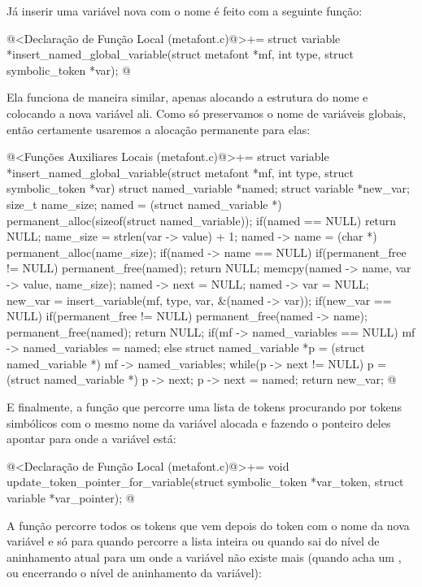 Já inserir uma variável nova com o nome é feito com a seguinte função:

\iniciocodigo
@<Declaração de Função Local (metafont.c)@>+=
struct variable *insert_named_global_variable(struct metafont *mf,
                                             int type,
                                             struct symbolic_token *var);
@
\fimcodigo

Ela funciona de maneira similar, apenas alocando a estrutura do nome e
colocando a nova variável ali. Como só preservamos o nome de variáveis
globais, então certamente usaremos a alocação permanente para elas:

\iniciocodigo
@<Funções Auxiliares Locais (metafont.c)@>+=
struct variable *insert_named_global_variable(struct metafont *mf,
                                             int type,
                                             struct symbolic_token *var){
  struct named_variable *named;
  struct variable *new_var;
  size_t name_size;
  named = (struct named_variable *)
              permanent_alloc(sizeof(struct named_variable));
  if(named == NULL)
    return NULL;
  name_size = strlen(var -> value) + 1;
  named -> name = (char *) permanent_alloc(name_size);
  if(named -> name == NULL){
    if(permanent_free != NULL)
      permanent_free(named);
    return NULL;
  }
  memcpy(named -> name, var -> value, name_size);
  named -> next = NULL;
  named -> var = NULL;
  new_var = insert_variable(mf, type, var, &(named -> var));
  if(new_var == NULL){
    if(permanent_free != NULL){
      permanent_free(named -> name);
      permanent_free(named);
      return NULL;
    }
  }
  if(mf -> named_variables == NULL){
    mf -> named_variables = named;
  }  
  else{
    struct named_variable *p = (struct named_variable *)
                                   mf -> named_variables;
    while(p -> next != NULL)
      p = (struct named_variable *) p -> next;
    p -> next = named;
  }
  return new_var;
}
@
\fimcodigo

E finalmente, a função que percorre uma lista de tokens procurando por
tokens simbólicos com o mesmo nome da variável alocada e fazendo o
ponteiro deles apontar para onde a variável está:

\iniciocodigo
@<Declaração de Função Local (metafont.c)@>+=
void update_token_pointer_for_variable(struct symbolic_token *var_token,
                                      struct variable *var_pointer);
@
\fimcodigo

A função percorre todos os tokens que vem depois do token com o nome
da nova variável e só para quando percorre a lista inteira ou quando
sai do nível de aninhamento atual para um onde a variável não existe
mais (quando acha um , 
ou  encerrando o nível de aninhamento da variável):

